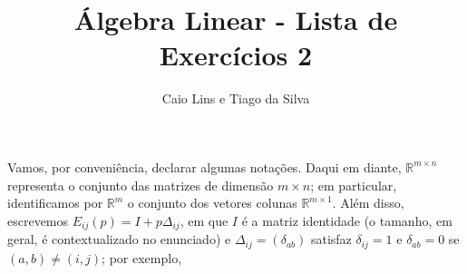 \documentclass[leqno]{article}
\begin{document}
\newtheorem{teo}{Teorema}[section] \newtheorem*{teo*}{Teorema}
\newtheorem{prop}[teo]{Proposição} \newtheorem*{prop*}{Proposição}
\newtheorem{lema}[teo]{Lemma} \newtheorem*{lema*}{Lema}
\newtheorem{cor}[teo]{Corolário} \newtheorem*{cor*}{Corolário}
\newtheorem{proposition}{Proposição} 
\theoremstyle{definition}
\newtheorem{defi}[teo]{Definição} \newtheorem*{defi*}{Definição}
\newtheorem{exem}[teo]{Exemplo} \newtheorem*{exem*}{Exemplo}
\newtheorem{obs}[teo]{Observação} \newtheorem*{obs*}{Observação}
\newtheorem*{hipo}{Hipóteses}
\newtheorem*{nota}{Notação}

\newcommand{\ds}{\displaystyle} \newcommand{\nl}{\newline}
\newcommand{\eps}{\varepsilon} \newcommand{\ssty}{\scriptstyle}
\newcommand{\bE}{\mathbb{E}}
\newcommand{\cB}{\mathcal{B}}
\newcommand{\cF}{\mathcal{F}}
\newcommand{\cA}{\mathcal{A}}
\newcommand{\cM}{\mathcal{M}}
\newcommand{\cD}{\mathcal{D}}
\newcommand{\cN}{\mathcal{N}}
\newcommand{\cL}{\mathcal{L}}
\newcommand{\cLN}{\mathcal{LN}}
\newcommand{\bP}{\mathbb{P}}
\newcommand{\bQ}{\mathbb{Q}}
\newcommand{\bN}{\mathbb{N}}
\newcommand{\bR}{\mathbb{R}}
\newcommand{\bZ}{\mathbb{Z}}

\newcommand{\bfw}{\mathbf{w}}
\newcommand{\bfv}{\mathbf{v}}
\newcommand{\bfu}{\mathbf{u}}

\newenvironment{sol}
{
    \vspace{4mm}
    \noindent\textbf{Resolução:}
    \strut\newline
    \smallskip
    \hspace{-3.5mm}
}
{}

\newcommand{\bvecc}[2]{%
  \begin{bmatrix} #1 \\ #2  \end{bmatrix}
}
\newcommand{\bveccc}[3]{%
  \begin{bmatrix} #1 \\ #2 \\ #3  \end{bmatrix}
}


\title{Álgebra Linear - Lista de Exercícios 2}

\author{Caio Lins e Tiago da Silva}

\date{}

\maketitle

Vamos, por conveniência, declarar algumas notações. Daqui em diante, $\mathbb{R}^{m \times n}$ representa o conjunto das matrizes de dimensão $m \times n$; em particular, identificamos por $\mathbb{R}^{m}$ o conjunto dos vetores colunas $\mathbb{R}^{m \times 1}$. Além disso, escrevemos $E_{ij}(p) = I + p \Delta_{ij}$, em que $I$ é a matriz identidade (o tamanho, em geral, é contextualizado no enunciado) e $\Delta_{ij} = (\delta_{ab})$ satisfaz $\delta_{ij} = 1$ e $\delta_{ab} = 0$ se $(a, b) \neq (i, j)$; por exemplo, 
\end{document}
